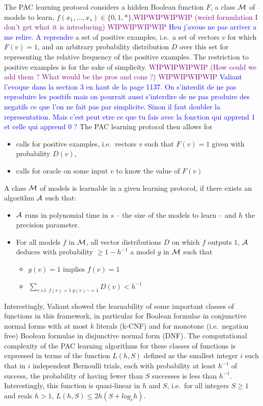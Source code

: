 \documentclass{llncs}
\newcommand{\wip}[1]{\textcolor{Purple}{WIPWIPWIPWIP #1 WIPWIPWIPWIP}}
\newcommand{\francois}[1]{\textcolor{blue}{#1}}
\begin{document}
The PAC learning protocol considers a hidden Boolean function $F$,
a class $\cal M$ of models to learn, $f(x_1,...,x_s) \in \{0,1,*\}$,\wip{(weird formulation I don't get what it is introducing)}
\francois{Heu j'avoue ne pas arriver a me relire. A reprendre}
a set of positive examples, i.e.~a set of vectors $v$ for which $F(v)=1$,
and an arbitrary probability distribution $D$ over this set
for representing the relative frequency of the positive examples.
The restriction to positive examples is for the sake of simplicity.
\wip{(How could we add them ? What would be the pros and cons ?)}
\francois{Valiant l'evoque dans la section 3 en haut de la page 1137. On s'interdit de ne pas reproduire les positifs mais on pourrait aussi s'interdire de ne pas produire des negatifs ce que l'on ne fait pas par simplicite. Sinon il faut doubler la representation. Mais c'est peut etre ce que tu fais avec la fonction qui apprend 1 et celle qui apprend 0 ?}
The PAC learning protocol then allows for
\begin{itemize}
  \item
calls for positive examples, i.e.~vectors $v$ such that $F(v)=1$ given with probability $D(v)$,
  \item
calls for oracle on some input $v$ to know the value of $F(v)$
\end{itemize}


A class $\cal M$ of models is learnable in a given learning protocol, if there exists an algorithm $\cal A$ such that:
\begin{itemize}
  \item
$\cal A$ runs in polynomial time in $s$ -- the size of the models to learn -- and $h$ the precision parameter.
  \item
For all models $f$ in $\cal M$,
all vector distributions $D$ on which $f$ outputs $1$,
$\cal A$ deduces with probability $\ge 1-h^{-1}$ a model $g$ in $\cal M$ such that
\begin{itemize}
  \item
$g(v)=1$ implies $f(v)=1$
\item
$\sum_{v\ s.t.~f(v)=1\ g(v)\neg=1} D(v) < h^{-1}$
\end{itemize}
\end{itemize}


Interestingly, Valiant showed the learnability of some important classes of functions in this framework,
in particular for Boolean formulae in conjunctive normal forms with at most $k$ literals (k-CNF)
and for monotone (i.e.~negation free) Boolean formulae in disjunctive normal form (DNF).
The computational complexity of the PAC learning algorithms for these classes of functions is expressed in terms of the function
$L(h,S)$ defined as the smallest integer $i$ such that
in $i$ independent Bernoulli trials, each with probability at least $h^{-1}$ of success, the probability of having fewer than $S$ successes is less than $h^{-1}$.
Interestingly, this function is quasi-linear in $h$ and $S$, i.e.~for all integers $S\ge 1$ and reals $h>1$, $L(h,S) \le 2h(S+log_eh)$.
\end{document}
